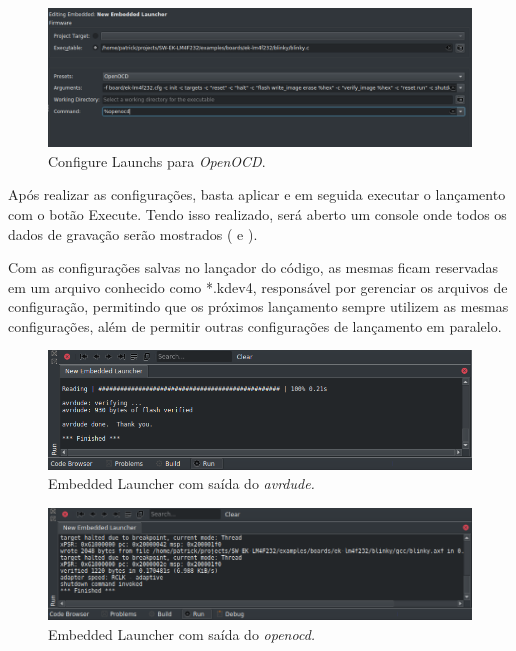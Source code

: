 \begin{figure}[!htb]
  \centering
  \includegraphics[width=1\textwidth]{figuras/openocd.png}
  \caption[\textit{Configure Launchs} para \textit{OpenOCD}]{Configure Launchs para \textit{OpenOCD}.}
  \label{fig:openocd}
\end{figure}

Após realizar as configurações, basta aplicar e em seguida executar o lançamento com o botão Execute. Tendo isso realizado, será aberto um console onde todos os dados de gravação serão mostrados ( e ).

Com as configurações salvas no lançador do código, as mesmas ficam reservadas em um arquivo conhecido como *.kdev4, responsável por gerenciar os arquivos de configuração, permitindo que os próximos lançamento sempre utilizem as mesmas configurações, além de permitir outras configurações de lançamento em paralelo.

\begin{figure}[!htb]
  \centering
  \includegraphics[width=1\textwidth]{figuras/runavrdude.png}
  \caption[\textit{Embedded Launcher} com \textit{avrdude}]{Embedded Launcher com saída do \textit{avrdude.}}
  \label{fig:runavrdude}
\end{figure}

\begin{figure}[!htb]
  \centering
  \includegraphics[width=1\textwidth]{figuras/runopenocd.png}
  \caption[\textit{Embedded Launcher} com \textit{openocd}]{Embedded Launcher com saída do \textit{openocd.}}
  \label{fig:runopenocd}
\end{figure}

